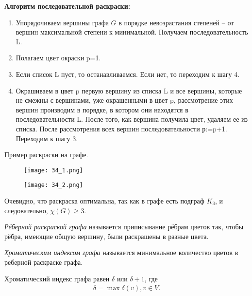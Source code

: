 \textbf{Алгоритм последовательной раскраски:}
\begin{enumerate}[left=0.0em, labelsep=1em, topsep=0.0em, itemsep=0pt, parsep=0.5em]
    \item Упорядочиваем вершины графа $G$ в порядке невозрастания степеней --
    от вершин максимальной степени к минимальной.
    Получаем последовательность L.
    \item Полагаем цвет окраски p=1.
    \item Если список L пуст, то останавливаемся. Если нет, то переходим к шагу
    4.
    \item Окрашиваем в цвет p первую вершину из списка L и все вершины,
    которые не смежны с вершинами, уже окрашенными в цвет p, рассмотрение
    этих вершин производим в порядке, в котором они находятся в
    последовательности L. После того, как вершина получила цвет, удаляем ее из
    списка. После рассмотрения всех вершин последовательности р:=p+1.
    Переходим к шагу 3.
\end{enumerate}

\newpage
Пример раскраски на графе.
\begin{figure}[h]
    \centering
    \texttt{[image: 34\_1.png]}
\end{figure}
\begin{figure}[h]
    \centering
    \texttt{[image: 34\_2.png]}
\end{figure}

Очевидно, что раскраска оптимальна, так как в графе есть подграф $K_3$,
и следовательно, $\chi(G) \geq 3$.

\begin{definition}
    \textit{Рёберной раскраской графа} называется приписывание рёбрам
    цветов так, чтобы рёбра, имеющие общую вершину, были раскрашены в
    разные цвета.
\end{definition}

\begin{definition}
    \textit{Хроматическим индексом графа} называется минимальное
    количество цветов в реберной раскраске графа.
\end{definition}

\begin{theorem}
    Хроматический индекс графа равен $\delta$ или $\delta+1$, где
    \begin{align*}
        \delta = \max \delta(v), v \in V.
    \end{align*}
\end{theorem}